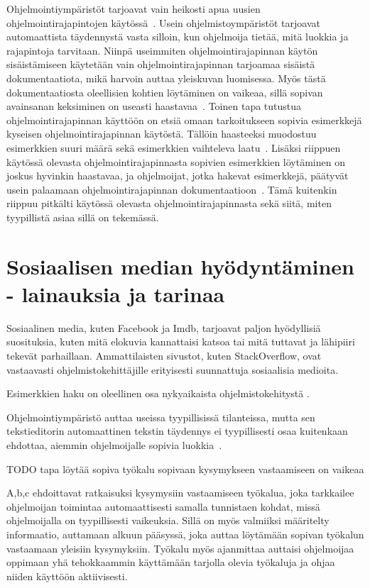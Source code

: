 \documentclass[finnish]{../tktltiki2}
\theoremstyle{definition}
\theoremstyle{remark}
\begin{document}
Ohjelmointiympäristöt tarjoavat vain heikosti apua uusien ohjelmointirajapintojen käytössä~\cite{jungloid-mining}. Usein ohjelmistoympäristöt tarjoavat automaattista täydennystä vasta silloin, kun ohjelmoija tietää, mitä luokkia ja rajapintoja tarvitaan. Niinpä useimmiten ohjelmointirajapinnan käytön sisäistämiseen käytetään vain ohjelmointirajapinnan tarjoamaa sisäistä dokumentaatiota, mikä harvoin auttaa yleiskuvan luomisessa. Myös tästä dokumentaatiosta oleellisien kohtien löytäminen on vaikeaa, sillä sopivan avainsanan keksiminen on useasti haastavaa~\cite{what-to-search-for}.
Toinen tapa tutustua ohjelmointirajapinnan käyttöön on etsiä omaan tarkoitukseen sopivia esimerkkejä kyseisen ohjelmointirajapinnan käytöstä. Tällöin haasteeksi muodostuu esimerkkien suuri määrä sekä esimerkkien vaihteleva laatu~\cite{example-overflow-social-media-for-code-recommendations}. Lisäksi riippuen käytössä olevasta ohjelmointirajapinnasta sopivien esimerkkien löytäminen on joskus hyvinkin haastavaa, ja ohjelmoijat, jotka hakevat esimerkkejä, päätyvät usein palaamaan ohjelmointirajapinnan dokumentaatioon~\cite{asking-and-answering-api-questions}. Tämä kuitenkin riippuu pitkälti käytössä olevasta ohjelmointirajapinnasta sekä siitä, miten tyypillistä asiaa sillä on tekemässä.

\section{Sosiaalisen median hyödyntäminen - lainauksia ja tarinaa}
Sosiaalinen media, kuten Facebook ja Imdb, tarjoavat paljon hyödyllisiä suosituksia, kuten mitä elokuvia kannattaisi katsoa tai mitä tuttavat ja lähipiiri tekevät parhaillaan. Ammattilaisten sivustot, kuten StackOverflow, ovat vastaavasti ohjelmistokehittäjille erityisesti suunnattuja sosiaalisia medioita.

Esimerkkien haku on oleellinen osa nykyaikaista ohjelmistokehitystä \cite{example-overflow-social-media-for-code-recommendations}.

Ohjelmointiympäristö auttaa useissa tyypillisissä tilanteissa, mutta sen tekstieditorin automaattinen tekstin täydennys ei tyypillisesti osaa kuitenkaan ehdottaa, aiemmin ohjelmoijalle sopivia luokkia~\cite{jungloid-mining}.

TODO tapa löytää sopiva työkalu sopivaan kysymykseen vastaamiseen on vaikeaa \cite{programmers-coach}

A,b,c ehdoittavat ratkaisuksi kysymysiin vastaamiseen työkalua, joka tarkkailee ohjelmoijan toimintaa automaattisesti samalla tunnistaen kohdat, missä ohjelmoijalla on tyypillisesti vaikeuksia. Sillä on myös valmiiksi määritelty informaatio, auttamaan alkuun pääsyssä, joka auttaa löytämään sopivan työkalun vastaamaan yleisiin kysymyksiin. Työkalu myös ajanmittaa auttaisi ohjelmoijaa oppimaan yhä tehokkaammin käyttämään tarjolla olevia työkaluja ja ohjaa niiden käyttöön aktiivisesti.
\cite{programmers-coach}
\end{document}
